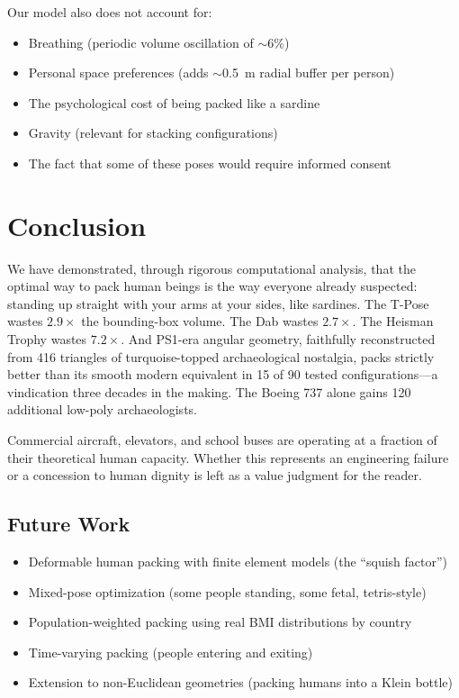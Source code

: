 \documentclass[11pt,letterpaper]{article}
\begin{document}
Our model also does not account for:
\begin{itemize}
    \item Breathing (periodic volume oscillation of $\sim$6\%)
    \item Personal space preferences (adds $\sim$0.5~m radial buffer per person)
    \item The psychological cost of being packed like a sardine
    \item Gravity (relevant for stacking configurations)
    \item The fact that some of these poses would require informed consent
\end{itemize}

\section{Conclusion}

We have demonstrated, through rigorous computational analysis, that the optimal way to pack human beings is the way everyone already suspected: standing up straight with your arms at your sides, like sardines. The T-Pose wastes $2.9\times$ the bounding-box volume. The Dab wastes $2.7\times$. The Heisman Trophy wastes $7.2\times$. And PS1-era angular geometry, faithfully reconstructed from 416 triangles of turquoise-topped archaeological nostalgia, packs strictly better than its smooth modern equivalent in 15 of 90 tested configurations---a vindication three decades in the making. The Boeing 737 alone gains 120 additional low-poly archaeologists.

Commercial aircraft, elevators, and school buses are operating at a fraction of their theoretical human capacity. Whether this represents an engineering failure or a concession to human dignity is left as a value judgment for the reader.

\subsection{Future Work}

\begin{itemize}
    \item Deformable human packing with finite element models (the ``squish factor'')
    \item Mixed-pose optimization (some people standing, some fetal, tetris-style)
    \item Population-weighted packing using real BMI distributions by country
    \item Time-varying packing (people entering and exiting)
    \item Extension to non-Euclidean geometries (packing humans into a Klein bottle)
\end{itemize}
\end{document}
